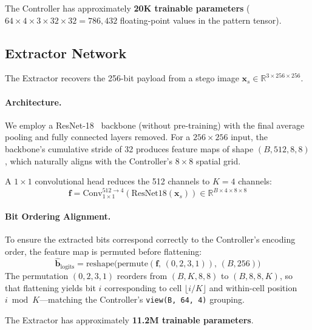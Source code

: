 \documentclass[10pt, twocolumn]{article}
\newcommand{\R}{\mathbb{R}}
\begin{document}
The Controller has approximately \textbf{20K trainable parameters} ($64 \times 4 \times 3 \times 32 \times 32 = 786{,}432$ floating-point values in the pattern tensor).

\subsection{Extractor Network}
\label{sec:extractor}

The Extractor recovers the 256-bit payload from a stego image $\mathbf{x}_s \in \R^{3 \times 256 \times 256}$.

\paragraph{Architecture.}
We employ a ResNet-18~\cite{he2016deep} backbone (without pre-training) with the final average pooling and fully connected layers removed.
For a $256 \times 256$ input, the backbone's cumulative stride of 32 produces feature maps of shape $(B, 512, 8, 8)$, which naturally aligns with the Controller's $8\times8$ spatial grid.

A $1\times1$ convolutional head reduces the 512 channels to $K = 4$ channels:
\begin{equation}
    \mathbf{f} = \text{Conv}_{1\times1}^{512 \to 4}(\text{ResNet18}(\mathbf{x}_s)) \in \R^{B \times 4 \times 8 \times 8}
    \label{eq:extractor_head}
\end{equation}

\paragraph{Bit Ordering Alignment.}
To ensure the extracted bits correspond correctly to the Controller's encoding order, the feature map is permuted before flattening:
\begin{equation}
    \hat{\mathbf{b}}_\text{logits} = \text{reshape}\big(\text{permute}(\mathbf{f},\, (0,2,3,1)),\, (B, 256)\big)
    \label{eq:permute}
\end{equation}
The permutation $(0,2,3,1)$ reorders from $(B, K, 8, 8)$ to $(B, 8, 8, K)$, so that flattening yields bit $i$ corresponding to cell $\lfloor i/K \rfloor$ and within-cell position $i \bmod K$---matching the Controller's \texttt{view(B, 64, 4)} grouping.

The Extractor has approximately \textbf{11.2M trainable parameters}.
\end{document}
